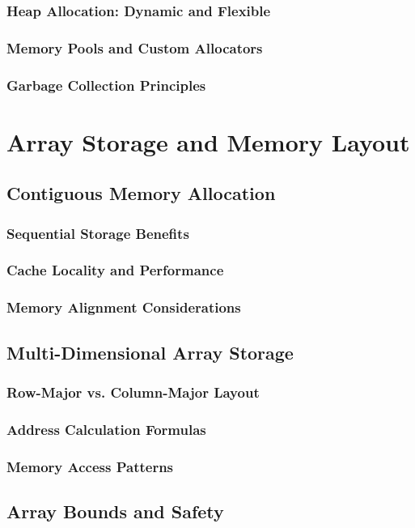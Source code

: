 \documentclass[12pt, oneside]{book}
\begin{document}
\subsubsection{Heap Allocation: Dynamic and Flexible}
\subsubsection{Memory Pools and Custom Allocators}
\subsubsection{Garbage Collection Principles}

\section{Array Storage and Memory Layout}
\subsection{Contiguous Memory Allocation}
\subsubsection{Sequential Storage Benefits}
\subsubsection{Cache Locality and Performance}
\subsubsection{Memory Alignment Considerations}

\subsection{Multi-Dimensional Array Storage}
\subsubsection{Row-Major vs. Column-Major Layout}
\subsubsection{Address Calculation Formulas}
\subsubsection{Memory Access Patterns}

\subsection{Array Bounds and Safety}
\end{document}
